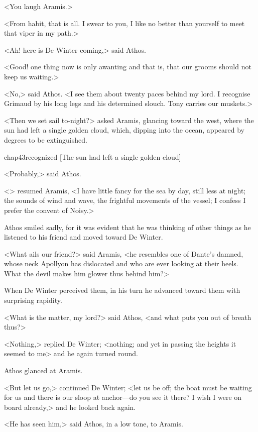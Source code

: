 <You laugh Aramis.>

<From habit, that is all. I swear to you, I like no better than yourself to meet that viper in my path.>

<Ah! here is De Winter coming,> said Athos.

<Good! one thing now is only awanting and that is, that our grooms should not keep us waiting.>

<No,> said Athos. <I see them about twenty paces behind my lord. I recognise Grimaud by his long legs and his determined slouch. Tony carries our muskets.>

<Then we set sail to-night?> asked Aramis, glancing toward the west, where the sun had left a single golden cloud, which, dipping into the ocean, appeared by degrees to be extinguished.

\begin{bwbigpic}
	[\basicscale] 
	{chap43recognized}
	[The sun had left a single golden cloud]
\end{bwbigpic}

<Probably,> said Athos.

<> resumed Aramis, <I have little fancy for the sea by day, still less at night; the sounds of wind and wave, the frightful movements of the vessel; I confess I prefer the convent of Noisy.>

Athos smiled sadly, for it was evident that he was thinking of other things as he listened to his friend and moved toward De Winter.

<What ails our friend?> said Aramis, <he resembles one of Dante's damned, whose neck Apollyon has dislocated and who are ever looking at their heels. What the devil makes him glower thus behind him?>

When De Winter perceived them, in his turn he advanced toward them with surprising rapidity.

<What is the matter, my lord?> said Athos, <and what puts you out of breath thus?>

<Nothing,> replied De Winter; <nothing; and yet in passing the heights it seemed to me\longdash> and he again turned round.

Athos glanced at Aramis.

<But let us go,> continued De Winter; <let us be off; the boat must be waiting for us and there is our sloop at anchor—do you see it there? I wish I were on board already,> and he looked back again.

<He has seen him,> said Athos, in a low tone, to Aramis.

